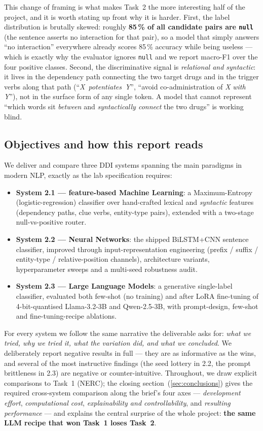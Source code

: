 \documentclass[a4paper,11pt]{article}
\begin{document}
This change of framing is what makes Task~2 the more interesting half of
the project, and it is worth stating up front why it is harder. First,
the label distribution is brutally skewed: roughly \textbf{85\,\% of all
candidate pairs are \texttt{null}} (the sentence asserts no interaction
for that pair), so a model that simply answers ``no interaction''
everywhere already scores 85\,\% accuracy while being useless --- which
is exactly why the evaluator ignores \texttt{null} and we report
macro-F1 over the four positive classes. Second, the discriminative
signal is \emph{relational and syntactic}: it lives in the dependency
path connecting the two target drugs and in the trigger verbs along that
path (``\textit{X}~\emph{potentiates}~\textit{Y}'', ``avoid
co-administration of \textit{X} \emph{with} \textit{Y}''), not in the
surface form of any single token. A model that cannot represent
``which words sit \emph{between} and \emph{syntactically connect} the
two drugs'' is working blind.

\subsection{Objectives and how this report reads}
We deliver and compare three DDI systems spanning the main paradigms in
modern NLP, exactly as the lab specification requires:
\begin{itemize}
    \item \textbf{System 2.1 --- feature-based Machine Learning}: a
    Maximum-Entropy (logistic-regression) classifier over hand-crafted
    lexical and \emph{syntactic} features (dependency paths, clue verbs,
    entity-type pairs), extended with a two-stage null-vs-positive
    router.
    \item \textbf{System 2.2 --- Neural Networks}: the shipped
    BiLSTM+CNN sentence classifier, improved through
    input-representation engineering (prefix / suffix / entity-type /
    relative-position channels), architecture variants, hyperparameter
    sweeps and a multi-seed robustness audit.
    \item \textbf{System 2.3 --- Large Language Models}: a generative
    single-label classifier, evaluated both few-shot (no training) and
    after LoRA fine-tuning of 4-bit-quantised Llama-3.2-3B and
    Qwen-2.5-3B, with prompt-design, few-shot and fine-tuning-recipe
    ablations.
\end{itemize}
For every system we follow the same narrative the deliverable asks for:
\emph{what we tried, why we tried it, what the variation did, and what
we concluded}. We deliberately report negative results in full --- they
are as informative as the wins, and several of the most instructive
findings (the seed lottery in 2.2, the prompt brittleness in 2.3) are
negative or counter-intuitive. Throughout, we draw explicit comparisons
to Task~1 (NERC); the closing section~(\ref{sec:conclusions}) gives the
required cross-system comparison along the brief's four axes ---
\emph{development effort}, \emph{computational cost}, \emph{explainability
and controllability}, and \emph{resulting performance} --- and explains
the central surprise of the whole project: \textbf{the same LLM recipe
that won Task~1 loses Task~2}.
\end{document}
